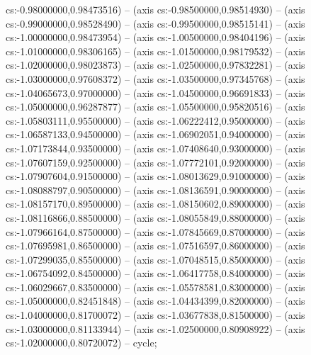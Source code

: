 cs:-0.98000000,0.98473516) -- (axis cs:-0.98500000,0.98514930) -- (axis cs:-0.99000000,0.98528490) -- (axis cs:-0.99500000,0.98515141) -- (axis cs:-1.00000000,0.98473954) -- (axis cs:-1.00500000,0.98404196) -- (axis cs:-1.01000000,0.98306165) -- (axis cs:-1.01500000,0.98179532) -- (axis cs:-1.02000000,0.98023873) -- (axis cs:-1.02500000,0.97832281) -- (axis cs:-1.03000000,0.97608372) -- (axis cs:-1.03500000,0.97345768) -- (axis cs:-1.04065673,0.97000000) -- (axis cs:-1.04500000,0.96691833) -- (axis cs:-1.05000000,0.96287877) -- (axis cs:-1.05500000,0.95820516) -- (axis cs:-1.05803111,0.95500000) -- (axis cs:-1.06222412,0.95000000) -- (axis cs:-1.06587133,0.94500000) -- (axis cs:-1.06902051,0.94000000) -- (axis cs:-1.07173844,0.93500000) -- (axis cs:-1.07408640,0.93000000) -- (axis cs:-1.07607159,0.92500000) -- (axis cs:-1.07772101,0.92000000) -- (axis cs:-1.07907604,0.91500000) -- (axis cs:-1.08013629,0.91000000) -- (axis cs:-1.08088797,0.90500000) -- (axis cs:-1.08136591,0.90000000) -- (axis cs:-1.08157170,0.89500000) -- (axis cs:-1.08150602,0.89000000) -- (axis cs:-1.08116866,0.88500000) -- (axis cs:-1.08055849,0.88000000) -- (axis cs:-1.07966164,0.87500000) -- (axis cs:-1.07845669,0.87000000) -- (axis cs:-1.07695981,0.86500000) -- (axis cs:-1.07516597,0.86000000) -- (axis cs:-1.07299035,0.85500000) -- (axis cs:-1.07048515,0.85000000) -- (axis cs:-1.06754092,0.84500000) -- (axis cs:-1.06417758,0.84000000) -- (axis cs:-1.06029667,0.83500000) -- (axis cs:-1.05578581,0.83000000) -- (axis cs:-1.05000000,0.82451848) -- (axis cs:-1.04434399,0.82000000) -- (axis cs:-1.04000000,0.81700072) -- (axis cs:-1.03677838,0.81500000) -- (axis cs:-1.03000000,0.81133944) -- (axis cs:-1.02500000,0.80908922) -- (axis cs:-1.02000000,0.80720072) -- cycle;
